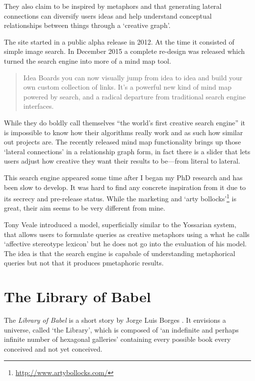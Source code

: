 They also claim to be inspired by metaphors and that generating lateral connections can diversify users ideas and help understand conceptual relationships between things through a `creative graph'.

The site started in a public alpha release in 2012. At the time it consisted of simple image search. In December 2015 a complete re-design was released \autocite{YossarianEmail} which turned the search engine into more of a mind map tool.

\begin{quotation}
  Idea Boards you can now visually jump from idea to idea and build your own custom collection of links. It's a powerful new kind of mind map powered by search, and a radical departure from traditional search engine interfaces. 
\end{quotation}

While they do boldly call themselves ``the world's first creative search engine'' \autocite{Yossarian2015} it is impossible to know how their algorithms really work and as such how similar out projects are. The recently released mind map functionality brings up those `lateral connections' in a relationship graph form, in fact there is a slider that lets users adjust how creative they want their results to be---from literal to lateral.

This search engine appeared some time after I began my PhD research and has been slow to develop. It was hard to find any concrete inspiration from it due to its secrecy and pre-release status. While the marketing and `arty bollocks'\footnote{\url{http://www.artybollocks.com/}} is great, their aim seems to be very different from mine.

Tony Veale introduced a model, superficially similar to the Yossarian system, that allows users to formulate queries as creative metaphors using a what he calls `affective stereotype lexicon' \autocite*{Veale2013} but he does not go into the evaluation of his model. The idea is that the search engine is capabale of understanding metaphorical queries but not that it produces pmetaphoric results.


\section{The Library of Babel}
\label{s:babel}

The \textit{Library of Babel} is a short story by Jorge Luis Borges \autocite*{Borges1964}. It envisions a universe, called `the Library', which is composed of `an indefinite and perhaps infinite number of hexagonal galleries' containing every possible book every conceived and not yet conceived.

